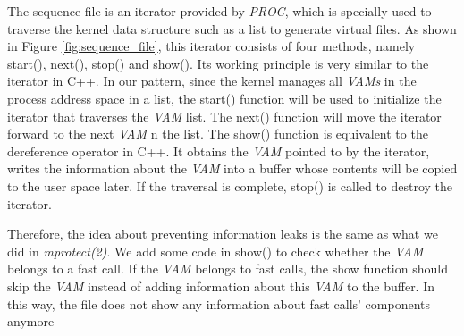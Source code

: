 The sequence file is an iterator provided by \emph{PROC}, which is 
specially used to traverse the kernel data structure such as a 
list to generate virtual files. As shown in Figure \ref{fig:sequence_file}, this 
iterator consists of four methods, namely start(), next(), 
stop() and show(). Its working principle is very similar to 
the iterator in C++. In our pattern, since the kernel manages 
all \emph{VAMs} in the process address space in a list, the start() 
function will be used to initialize the iterator that traverses 
the \emph{VAM} list. The next() function will move the iterator forward 
to the next \emph{VAM}  n the list. The show() function is equivalent to 
the dereference operator in C++. It obtains the \emph{VAM} pointed to by 
the iterator, writes the information about the \emph{VAM} into a buffer 
whose contents will be copied to the user space later. If the 
traversal is complete, stop() is called to destroy the iterator.

Therefore, the idea about preventing information leaks is the
 same as what we did in \emph{mprotect(2)}. We add some code in show() to 
 check whether the \emph{VAM} belongs to a fast call.  If the \emph{VAM} 
 belongs to fast calls, the show function should skip the \emph{VAM} 
 instead of adding information about this \emph{VAM} to the buffer. 
 In this way, the file does not show any information about 
 fast calls' components anymore



\cleardoublepage




